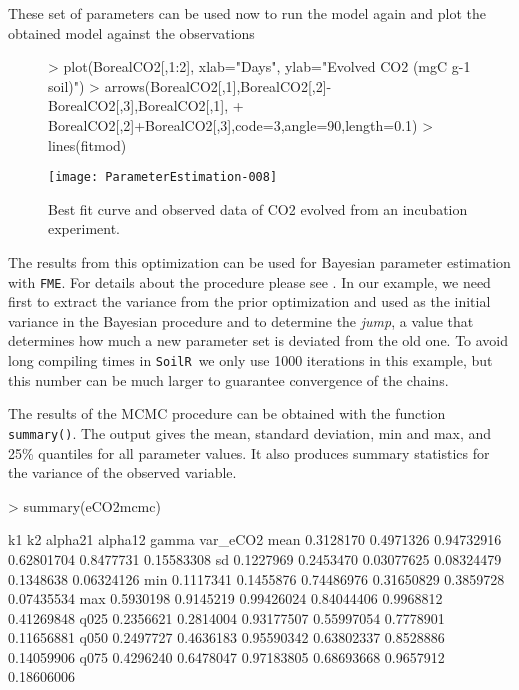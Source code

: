 \documentclass[a4paper]{article}
\newcommand{\SoilR}{\texttt{SoilR}}
\newcommand{\FME}{\texttt{FME}}
\begin{document}
These set of parameters can be used now to run the model again and plot the obtained model against the observations

\begin{Schunk}
\end{Schunk}

\begin{figure}
  \centering
\begin{Schunk}
\begin{Sinput}
> plot(BorealCO2[,1:2], xlab="Days", ylab="Evolved CO2 (mgC g-1 soil)")
> arrows(BorealCO2[,1],BorealCO2[,2]-BorealCO2[,3],BorealCO2[,1],
+        BorealCO2[,2]+BorealCO2[,3],code=3,angle=90,length=0.1)
> lines(fitmod)
\end{Sinput}
\end{Schunk}
\texttt{[image: ParameterEstimation-008]}
  \caption{Best fit curve and observed data of CO2 evolved from an incubation experiment.}
  \label{fig:fit}
\end{figure}

The results from this optimization can be used for Bayesian parameter estimation with \FME. For details about the procedure please see \citet{Soetaert}. In our example, we need first to extract the variance from the prior optimization and used as the initial variance in the Bayesian procedure and to determine the {\it jump}, a value that determines how much a new parameter set is deviated from the old one. To avoid long compiling times in \SoilR \,  we only use 1000 iterations in this example, but this number can be much larger to guarantee convergence of the chains. 


The results of the MCMC procedure can be obtained with the function {\tt summary()}. The output gives the mean, standard deviation, min and max, and 25\% quantiles for all parameter values. It also produces summary statistics for the variance of the observed variable. 


\begin{Schunk}
\begin{Sinput}
> summary(eCO2mcmc)
\end{Sinput}
\begin{Soutput}
            k1        k2    alpha21    alpha12     gamma   var_eCO2
mean 0.3128170 0.4971326 0.94732916 0.62801704 0.8477731 0.15583308
sd   0.1227969 0.2453470 0.03077625 0.08324479 0.1348638 0.06324126
min  0.1117341 0.1455876 0.74486976 0.31650829 0.3859728 0.07435534
max  0.5930198 0.9145219 0.99426024 0.84044406 0.9968812 0.41269848
q025 0.2356621 0.2814004 0.93177507 0.55997054 0.7778901 0.11656881
q050 0.2497727 0.4636183 0.95590342 0.63802337 0.8528886 0.14059906
q075 0.4296240 0.6478047 0.97183805 0.68693668 0.9657912 0.18606006
\end{Soutput}
\end{Schunk}
\end{document}
